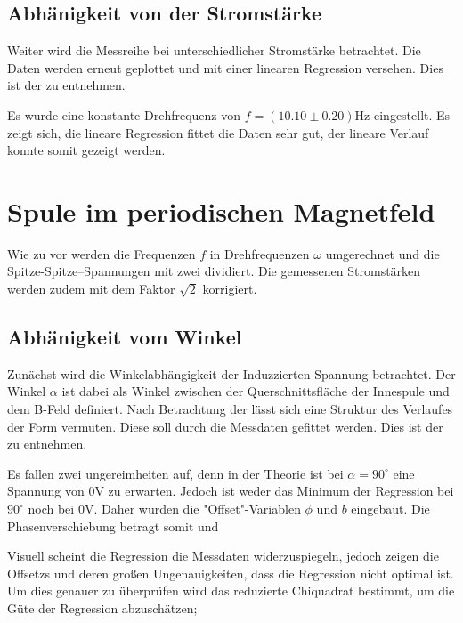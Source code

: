 \subsection{Abhänigkeit von der Stromstärke}
Weiter wird die Messreihe bei unterschiedlicher Stromstärke betrachtet. Die Daten werden erneut geplottet und mit einer linearen Regression versehen.
Dies ist der  zu entnehmen.

Es wurde eine konstante Drehfrequenz von $f =(10.10 \pm 0.20)$Hz eingestellt. Es zeigt sich, die lineare Regression fittet die Daten sehr gut, der lineare Verlauf konnte somit gezeigt werden.

\section{Spule im periodischen Magnetfeld}
\label{sec:A2}
Wie zu vor werden die Frequenzen $f$ in Drehfrequenzen $\omega$ umgerechnet und die Spitze-Spitze--Spannungen mit zwei dividiert. Die gemessenen Stromstärken werden zudem mit dem Faktor $\sqrt{2}$ korrigiert.

\subsection{Abhänigkeit vom Winkel}
Zunächst wird die Winkelabhängigkeit der Induzzierten Spannung betrachtet. Der Winkel $\alpha$ ist dabei als Winkel zwischen der Querschnittsfläche der Innespule und dem B-Feld definiert. Nach Betrachtung der  lässt sich eine Struktur des Verlaufes der Form
vermuten. Diese soll durch die Messdaten gefittet werden. Dies ist der  zu entnehmen.

Es fallen zwei ungereimheiten auf, denn in der Theorie ist bei $\alpha = 90^\circ$ eine Spannung von $0$V zu erwarten. Jedoch ist weder das Minimum der Regression bei $90^\circ$ noch bei $0$V. Daher wurden die "Offset"-Variablen $\phi$ und $b$ eingebaut. Die Phasenverschiebung betragt somit
und

Visuell scheint die Regression die Messdaten widerzuspiegeln, jedoch zeigen die Offsetzs und deren großen Ungenauigkeiten, dass die Regression nicht optimal ist. Um dies genauer zu überprüfen wird das reduzierte Chiquadrat bestimmt, um die Güte der Regression abzuschätzen;

